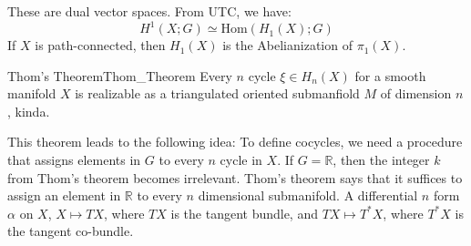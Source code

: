 \documentclass{book}                                                           %
\begin{document}
            These are dual vector spaces. From UTC, we have:
            \begin{equation}
                H^{1}(X;G)\simeq
                \mathrm{Hom}(H_{1}(X);G)
            \end{equation}
            If $X$ is path-connected, then $H_{1}(X)$ is the
            Abelianization of $\pi_{1}(X)$.
            \begin{ltheorem}{Thom's Theorem}{Thom_Theorem}
                Every $n$ cycle $\xi\in{H}_{n}(X)$ for a
                smooth manifold $X$ is realizable as a
                triangulated oriented submanfiold $M$ of
                dimension $n$, kinda.
            \end{ltheorem}
            This theorem leads to the following idea:
            To define cocycles, we need a procedure that
            assigns elements in $G$ to every $n$ cycle in
            $X$. If $G=\mathbb{R}$, then the integer $k$ from
            Thom's theorem becomes irrelevant. Thom's theorem
            says that it suffices to assign an element in
            $\mathbb{R}$ to every $n$ dimensional submanifold.
            A differential $n$ form $\alpha$ on $X$,
            $X\mapsto{TX}$, where $TX$ is the tangent bundle,
            and $TX\mapsto{T^{*}}X$, where $T^{*}X$ is the
            tangent co-bundle. 
\end{document}

